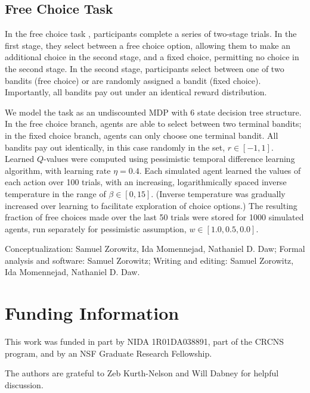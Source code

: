 \documentclass[manuscript]{stjour}
\begin{document}
\subsection{Free Choice Task}
In the free choice task \citep{Leotti2011}, participants complete a series of two-stage trials. In the first stage, they select between a free choice option, allowing them to make an additional choice in the second stage, and a fixed choice, permitting no choice in the second stage. In the second stage, participants select between one of two bandits (free choice) or are randomly assigned a bandit (fixed choice). Importantly, all bandits pay out under an identical reward distribution. 

We model the task as an undiscounted MDP with 6 state decision tree structure. In the free choice branch, agents are able to select between two terminal bandits; in the fixed choice branch, agents can only choose one terminal bandit. All bandits pay out identically, in this case randomly in the set, $r \in [-1, 1]$. Learned $Q$-values were computed using pessimistic temporal difference learning algorithm, with learning rate $\eta = 0.4$. Each simulated agent learned the values of each action over 100 trials, with an increasing, logarithmically spaced inverse temperature in the range of $\beta \in [0, 15]$. (Inverse temperature was gradually increased over learning to facilitate exploration of choice options.) The resulting fraction of free choices made over the last 50 trials were stored for 1000 simulated agents, run separately for pessimistic assumption, $w \in [1.0, 0.5, 0.0]$. 


% 

\authorcontributions 
Conceptualization: Samuel Zorowitz, Ida Momennejad, Nathaniel D. Daw; Formal analysis and software: Samuel Zorowitz; Writing and editing: Samuel Zorowitz, Ida Momennejad, Nathaniel D. Daw.

\section{Funding Information}
This work was funded in part by NIDA 1R01DA038891, part of the CRCNS program, and by an NSF Graduate Research Fellowship.

\acknowledgments
The authors are grateful to Zeb Kurth-Nelson and Will Dabney for helpful discussion. 

\nocite{*}

\end{document}
